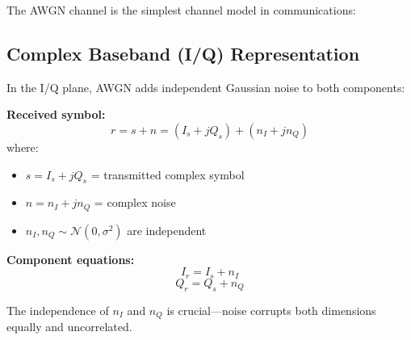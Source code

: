 The AWGN channel is the simplest channel model in communications:

\begin{center}
\end{center}

\subsection{Complex Baseband (I/Q) Representation}

In the I/Q plane, AWGN adds independent Gaussian noise to both components:

\textbf{Received symbol:}
\begin{equation}
r = s + n = (I_s + jQ_s) + (n_I + jn_Q)
\end{equation}
where:
\begin{itemize}
\item $s = I_s + jQ_s$ = transmitted complex symbol
\item $n = n_I + jn_Q$ = complex noise
\item $n_I, n_Q \sim \mathcal{N}(0, \sigma^2)$ are independent
\end{itemize}

\textbf{Component equations:}
\begin{equation}
I_r = I_s + n_I
\end{equation}
\begin{equation}
Q_r = Q_s + n_Q
\end{equation}

The independence of $n_I$ and $n_Q$ is crucial---noise corrupts both dimensions equally and uncorrelated.

